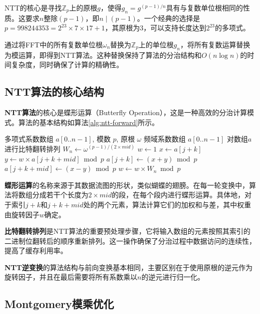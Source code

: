 \documentclass[a4paper]{article}
\begin{document}
NTT的核心是寻找$\mathbb{Z}_p$上的原根$g$，使得$g_n = g^{(p-1)/n}$具有与复数单位根相同的性质。这要求$n$整除$(p-1)$，即$n \mid (p-1)$。一个经典的选择是$p = 998244353 = 2^{23} \times 7 \times 17 + 1$，其原根为$3$，可以支持长度达到$2^{23}$的多项式。

通过将FFT中的所有复数单位根$\omega_n$替换为$\mathbb{Z}_p$上的单位根$g_n$，将所有复数运算替换为模运算，即得到NTT算法。这种替换保持了算法的分治结构和$O(n\log n)$的时间复杂度，同时确保了计算的精确性。

\subsection{NTT算法的核心结构}

\textbf{NTT算法}的核心是蝶形运算（Butterfly Operation），这是一种高效的分治计算模式。算法的基本结构如算法\ref{alg:ntt-forward}所示。

\begin{algorithm}[htbp]
\caption{NTT前向变换算法}
\label{alg:ntt-forward}
\begin{algorithmic}[1]
\Require 多项式系数数组 $a[0..n-1]$, 模数 $p$, 原根 $\omega$
\Ensure 频域系数数组 $a[0..n-1]$
\State 对数组$a$进行比特翻转排列
    \State $W_n \gets \omega^{(p-1)/(2 \times mid)}$
        \State $w \gets 1$
            \State $x \gets a[j + k]$
            \State $y \gets w \times a[j + k + mid] \bmod p$
            \State $a[j + k] \gets (x + y) \bmod p$
            \State $a[j + k + mid] \gets (x - y) \bmod p$
            \State $w \gets w \times W_n \bmod p$
        \EndFor
    \EndFor
\EndFor
\end{algorithmic}
\end{algorithm}

\textbf{蝶形运算}的名称来源于其数据流图的形状，类似蝴蝶的翅膀。在每一轮变换中，算法将数组分成若干个长度为$2 \times mid$的段，在每个段内进行蝶形运算。具体地，对于索引$j+k$和$j+k+mid$处的两个元素，算法计算它们的加权和与差，其中权重由旋转因子$w$确定。

\textbf{比特翻转排列}是NTT算法的重要预处理步骤，它将输入数组的元素按照其索引的二进制位翻转后的顺序重新排列。这一操作确保了分治过程中数据访问的连续性，提高了缓存利用率。

\textbf{NTT逆变换}的算法结构与前向变换基本相同，主要区别在于使用原根的逆元作为旋转因子，并且在最后需要将所有系数乘以$n$的逆元进行归一化。

\subsection{Montgomery模乘优化}
\end{document}

